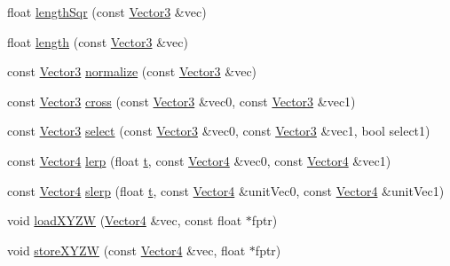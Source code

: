 \begin{DoxyCompactItemize}
\item 
float \hyperlink{namespaceVectormath_1_1Aos_a4efa8592754a4095f9d40bbaaa6c323e}{length\-Sqr} (const \hyperlink{classVectormath_1_1Aos_1_1Vector3}{Vector3} \&vec)
\item 
float \hyperlink{namespaceVectormath_1_1Aos_a95fdca07d93df96f2b4963202f441645}{length} (const \hyperlink{classVectormath_1_1Aos_1_1Vector3}{Vector3} \&vec)
\item 
const \hyperlink{classVectormath_1_1Aos_1_1Vector3}{Vector3} \hyperlink{namespaceVectormath_1_1Aos_ab3e70844bb4af420d7c012562c6cd4c0}{normalize} (const \hyperlink{classVectormath_1_1Aos_1_1Vector3}{Vector3} \&vec)
\item 
const \hyperlink{classVectormath_1_1Aos_1_1Vector3}{Vector3} \hyperlink{namespaceVectormath_1_1Aos_a1fd2b64c21e5517a060ff05160234ff7}{cross} (const \hyperlink{classVectormath_1_1Aos_1_1Vector3}{Vector3} \&vec0, const \hyperlink{classVectormath_1_1Aos_1_1Vector3}{Vector3} \&vec1)
\item 
const \hyperlink{classVectormath_1_1Aos_1_1Vector3}{Vector3} \hyperlink{namespaceVectormath_1_1Aos_a30ea0db85d7de0ea4d81d5b29494d14b}{select} (const \hyperlink{classVectormath_1_1Aos_1_1Vector3}{Vector3} \&vec0, const \hyperlink{classVectormath_1_1Aos_1_1Vector3}{Vector3} \&vec1, bool select1)
\item 
const \hyperlink{classVectormath_1_1Aos_1_1Vector4}{Vector4} \hyperlink{namespaceVectormath_1_1Aos_ab0809a90f4b31c3cf4a797c0cea89cd3}{lerp} (float \hyperlink{Main_8cpp_a0c8806dd40fb0525e1a3a2a5f78ef88d}{t}, const \hyperlink{classVectormath_1_1Aos_1_1Vector4}{Vector4} \&vec0, const \hyperlink{classVectormath_1_1Aos_1_1Vector4}{Vector4} \&vec1)
\item 
const \hyperlink{classVectormath_1_1Aos_1_1Vector4}{Vector4} \hyperlink{namespaceVectormath_1_1Aos_a4845310fe48e0284c6cc8101f003fb67}{slerp} (float \hyperlink{Main_8cpp_a0c8806dd40fb0525e1a3a2a5f78ef88d}{t}, const \hyperlink{classVectormath_1_1Aos_1_1Vector4}{Vector4} \&unit\-Vec0, const \hyperlink{classVectormath_1_1Aos_1_1Vector4}{Vector4} \&unit\-Vec1)
\item 
void \hyperlink{namespaceVectormath_1_1Aos_a2d8ef81e28ac63755abaccfe568d40a8}{load\-X\-Y\-Z\-W} (\hyperlink{classVectormath_1_1Aos_1_1Vector4}{Vector4} \&vec, const float $\ast$fptr)
\item 
void \hyperlink{namespaceVectormath_1_1Aos_a26d03e1f3e0c076bc409eb80ec8416f5}{store\-X\-Y\-Z\-W} (const \hyperlink{classVectormath_1_1Aos_1_1Vector4}{Vector4} \&vec, float $\ast$fptr)
\item 

\end{DoxyCompactItemize}
